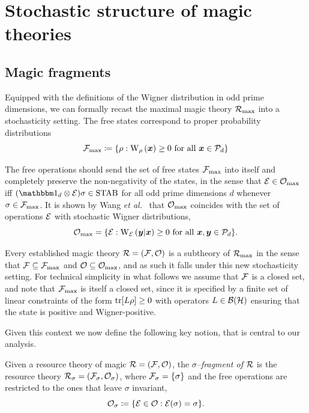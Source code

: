 \documentclass[pra,
aps,
twocolumn,
superscriptaddress,
groupedaddress,
nofootinbib,
reprint
]{revtex4-1}
\begin{document}

\section{Stochastic structure of magic theories}
\label{sec:struc}

\subsection{Magic fragments}\label{sec:magfrag}

Equipped with the definitions of the Wigner distribution in odd prime dimensions, we can formally recast the maximal magic theory $\Rmax$ into a stochasticity setting.
The free states correspond to proper probability distributions 
\begin{equation}
    \Fmax \coloneqq \{ \rho: \W[\bmx]{\rho} \geq 0 \text{ for all } \bmx \in \cal{P}_d\}
\end{equation}

The free operations should send the set of free states $\Fmax$ into itself and completely preserve the non-negativity of the states, in the sense that $\E \in \Omax$ iff $(\id_d \otimes \E ) \sigma \in \stab$ for all odd prime dimensions $d$ whenever $\sigma \in \Fmax$.
It is shown by Wang \textit{et al.}~\cite{Wang_2019} that $\Omax$ coincides with the set of operations $\E$ with stochastic Wigner distributions, 
\begin{equation}
    \Omax = \{ \E: \W[\bmy|\bmx]{\E} \geq 0 \text{ for all } \bmx, \bmy \in \cal{P}_d\}.
\end{equation}

Every established magic theory $\R = (\F, \O)$ is a subtheory of $\Rmax$ in the sense that $\F \subseteq \Fmax$ and $\O \subseteq \Omax$, and as such it falls under this new stochasticity setting. 
For technical simplicity in what follows we assume that $\F$ is a closed set, and note that $\F_{\rm{ max}}$ is itself a closed set, since it is specified by a finite set of linear constraints of the form $\tr[ L\rho] \geq 0$ with operators $L \in \cal{B}(\cal{H})$ ensuring that the state is positive and Wigner-positive.


Given this context we now define the following key notion, that is central to our analysis.
\begin{definition}\label{def:sigmafrag}
   Given a resource theory of magic $\R = (\F, \O)$, the \emph{$\sigma$--fragment of $\R$} is the resource theory $\R_\sigma = (\F_\sigma, \O_\sigma)$, where $\F_\sigma = \{\sigma\}$ and the free operations are restricted to the ones that leave $\sigma$ invariant,
    \begin{equation}
        \O_\sigma \coloneqq \{ \E \in \O: \E(\sigma) = \sigma \}.
    \end{equation}
\end{definition}
\end{document}

